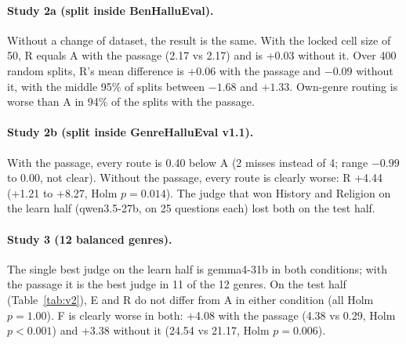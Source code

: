 \documentclass[11pt]{article}
\begin{document}
\paragraph{Study 2a (split inside BenHalluEval).} Without a change of dataset, the result is the same. With the
locked cell size of 50, R equals A with the passage (2.17 vs 2.17) and is +0.03 without it. Over 400 random splits,
R's mean difference is +0.06 with the passage and $-0.09$ without it, with the middle 95\% of splits between $-1.68$
and $+1.33$. Own-genre routing is worse than A in 94\% of the splits with the passage.

\paragraph{Study 2b (split inside GenreHalluEval v1.1).} With the passage, every route is 0.40 below A (2 misses
instead of 4; range $-0.99$ to $0.00$, not clear). Without the passage, every route is clearly worse: R +4.44 (+1.21 to
+8.27, Holm $p=0.014$). The judge that won History and Religion on the learn half (qwen3.5-27b, on 25 questions each)
lost both on the test half.

\paragraph{Study 3 (12 balanced genres).} The single best judge on the learn half is gemma4-31b in both conditions;
with the passage it is the best judge in 11 of the 12 genres. On the test half (Table~\ref{tab:v2}), E and R do not
differ from A in either condition (all Holm $p=1.00$). F is clearly worse in both: +4.08 with the passage (4.38 vs
0.29, Holm $p<0.001$) and +3.38 without it (24.54 vs 21.17, Holm $p=0.006$).
\end{document}
